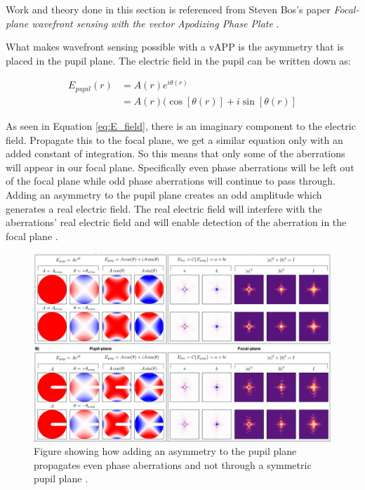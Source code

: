 Work and theory done in this section is referenced from Steven Bos's paper \textit{Focal-plane wavefront sensing with the vector Apodizing Phase Plate} \cite{Bos2019Focal-planePlate}.

What makes wavefront sensing possible with a vAPP is the asymmetry that is placed in the pupil plane.  The electric field in the pupil can be written down as:

\begin{align}
    E_{pupil}(r) &= A(r) e^{i \theta(r)} \\
    &= A(r) (\cos[\theta (r)] + i\sin[\theta (r)]
    \label{eq:E_field}
\end{align}

As seen in Equation \ref{eq:E_field}, there is an imaginary component to the electric field.  Propagate this to the focal plane, we get a similar equation only with an added constant of integration.  So this means that only some of the aberrations will appear in our focal plane.  Specifically even phase aberrations will be left out of the focal plane while odd phase aberrations will continue to pass through.  Adding an asymmetry to the pupil plane creates an odd amplitude which generates a real electric field.  The real electric field will interfere with the aberrations' real electric field and will enable detection of the aberration in the focal plane \cite{Bos2019Focal-planePlate}.



\begin{figure}[H]
\centering
\includegraphics[width=14 cm]{Figures/asymmetry.png}
\caption{Figure showing how adding an asymmetry to the pupil plane propagates even phase aberrations and not through a symmetric pupil plane \cite{Bos2019Focal-planePlate}.}
\label{fig:vapp_concept}
\end{figure}




